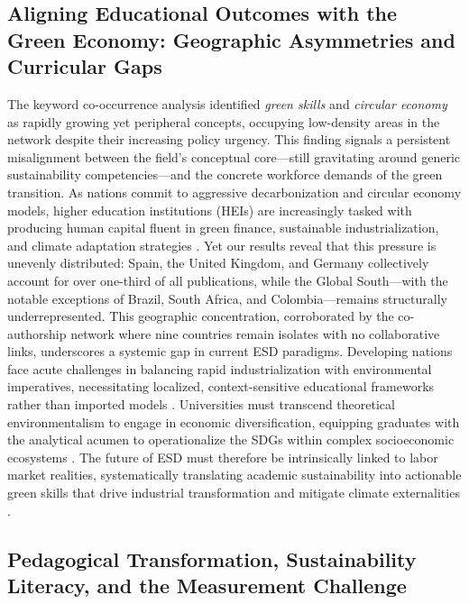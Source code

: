 \documentclass[pdflatex,sn-basic]{sn-jnl}%
\begin{document}
\subsection{Aligning Educational Outcomes with the Green Economy: Geographic Asymmetries and Curricular Gaps}

The keyword co-occurrence analysis identified \textit{green skills} and \textit{circular economy} as rapidly growing yet peripheral concepts, occupying low-density areas in the network despite their increasing policy urgency. This finding signals a persistent misalignment between the field's conceptual core---still gravitating around generic sustainability competencies---and the concrete workforce demands of the green transition. As nations commit to aggressive decarbonization and circular economy models, higher education institutions (HEIs) are increasingly tasked with producing human capital fluent in green finance, sustainable industrialization, and climate adaptation strategies \cite{tamasiga_green_2025, desalegn_developing_2022}. Yet our results reveal that this pressure is unevenly distributed: Spain, the United Kingdom, and Germany collectively account for over one-third of all publications, while the Global South---with the notable exceptions of Brazil, South Africa, and Colombia---remains structurally underrepresented. This geographic concentration, corroborated by the co-authorship network where nine countries remain isolates with no collaborative links, underscores a systemic gap in current ESD paradigms. Developing nations face acute challenges in balancing rapid industrialization with environmental imperatives, necessitating localized, context-sensitive educational frameworks rather than imported models \cite{ndoka_comparative_2025, dias_paiao_junior_economic_2024}. Universities must transcend theoretical environmentalism to engage in economic diversification, equipping graduates with the analytical acumen to operationalize the SDGs within complex socioeconomic ecosystems \cite{st_flour_sustainability_2021}. The future of ESD must therefore be intrinsically linked to labor market realities, systematically translating academic sustainability into actionable green skills that drive industrial transformation and mitigate climate externalities \cite{garcia-hernandez_structural_2025}.

\subsection{Pedagogical Transformation, Sustainability Literacy, and the Measurement Challenge}
\end{document}
